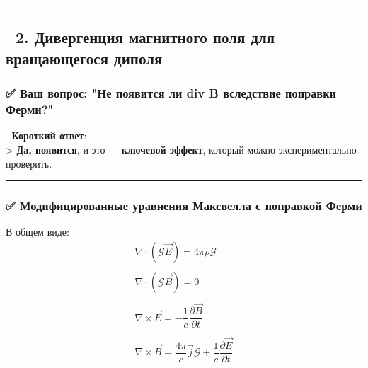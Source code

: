 \documentclass[11pt]{article}
\begin{document}
\begin{center}\rule{0.5\linewidth}{\linethickness}\end{center}

\subsection{🔹 2. Дивергенция магнитного поля для вращающегося
диполя}\label{ux434ux438ux432ux435ux440ux433ux435ux43dux446ux438ux44f-ux43cux430ux433ux43dux438ux442ux43dux43eux433ux43e-ux43fux43eux43bux44f-ux434ux43bux44f-ux432ux440ux430ux449ux430ux44eux449ux435ux433ux43eux441ux44f-ux434ux438ux43fux43eux43bux44f}

\subsubsection{✅ Ваш вопрос: "Не появится ли div B вследствие поправки
Ферми?"}\label{ux432ux430ux448-ux432ux43eux43fux440ux43eux441-ux43dux435-ux43fux43eux44fux432ux438ux442ux441ux44f-ux43bux438-div-b-ux432ux441ux43bux435ux434ux441ux442ux432ux438ux435-ux43fux43eux43fux440ux430ux432ux43aux438-ux444ux435ux440ux43cux438}

📌 \textbf{Короткий ответ}:\\
\textgreater{} \textbf{Да, появится}, и это --- \textbf{ключевой
эффект}, который можно экспериментально проверить.

\begin{center}\rule{0.5\linewidth}{\linethickness}\end{center}

\subsubsection{✅ Модифицированные уравнения Максвелла с поправкой
Ферми}\label{ux43cux43eux434ux438ux444ux438ux446ux438ux440ux43eux432ux430ux43dux43dux44bux435-ux443ux440ux430ux432ux43dux435ux43dux438ux44f-ux43cux430ux43aux441ux432ux435ux43bux43bux430-ux441-ux43fux43eux43fux440ux430ux432ux43aux43eux439-ux444ux435ux440ux43cux438}

В общем виде: \[
\boxed{
\begin{array}{c}
\nabla \cdot (\mathcal{G} \vec{E}) = 4\pi \rho \mathcal{G} \\
\\
\nabla \cdot (\mathcal{G} \vec{B}) = 0 \\
\\
\nabla \times \vec{E} = -\dfrac{1}{c} \dfrac{\partial \vec{B}}{\partial t} \\
\\
\nabla \times \vec{B} = \dfrac{4\pi}{c} \vec{j} \mathcal{G} + \dfrac{1}{c} \dfrac{\partial \vec{E}}{\partial t}
\end{array}
}
\]
\end{document}
